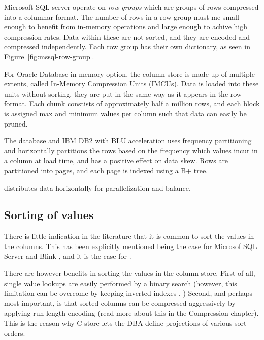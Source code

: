 Microsoft SQL server operate on \textit{row groups} which are groups of rows compressed into a columnar format. The number of rows in a row group must me small enough to benefit from in-memory operations and large enough to achive high compression rates. Data within these are not sorted, and they are encoded and compressed independently. Each row group has their own dictionary, as seen in Figure~\ref{fig:mssql-row-group}.

For Oracle Database in-memory option, the column store is made up of multiple extents, called In-Memory Compression Units (IMCUs). Data is loaded into these units without sorting, they are put in the same way as it appears in the row format. Each chunk constists of approximately half a million rows, and each block is assigned max and minimum values per column such that data can easily be pruned.

The  database and IBM DB2 with BLU acceleration  \cite{Barber2012-xt, Raman2013-em, Raman2008-gi} uses frequency partitioning and horizontally partitions the rows based on the frequency which values incur in a column at load time, and has a positive effect on data skew. Rows are partitioned into pages, and each page is indexed using a B+ tree.

 distributes data horizontally for parallelization and balance.

\subsection{Sorting of values}
\label{sub:Sorting of values}
There is little indication in the literature that it is common to sort the values in the columns. This has been explicitly mentioned being the case for Microsof SQL Server \cite{Larson2013-mc} and Blink \cite{Raman2013-em}, and it is the case for .

There are however benefits in sorting the values in the column store. First of all, single value lookups are easily performed by a binary search (however, this limitation can be overcome by keeping inverted indexes \cite{Lemke2010-is}, \cite{Schwalb2014-hn}) Second, and perhaps most important, is that sorted columns can be compressed aggressively by applying run-length encoding (read more about this in the Compression chapter). This is the reason why C-store \cite{Stonebraker2005-qz} lets the DBA define projections of various sort orders.

